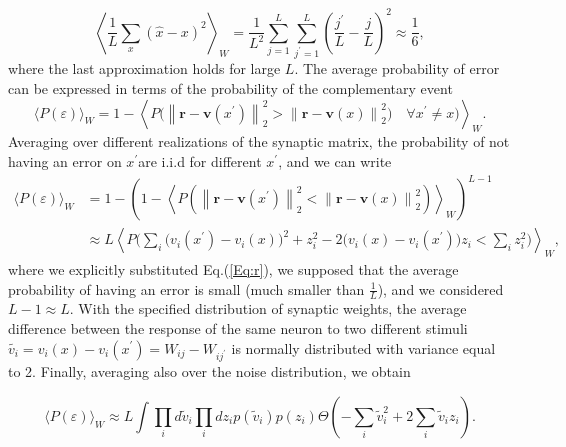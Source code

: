 \documentclass[a4paper]{article}%
\begin{document}
\begin{equation}
\left\langle \frac{1}{L}\sum_{x} (\hat{x}-x)^{2}\right\rangle _{W} =\frac
{1}{L^{2}}\sum_{j=1}^{L} \sum_{j^{\prime}=1}^{L} \left( \frac{j^{\prime}}%
{L}-\frac{j}{L}\right) ^{2} \approx\frac{1}{6},
\end{equation}
where the last approximation holds for large $L$. The average probability of
error can be expressed in terms of the probability of the complementary event
\begin{equation}
\langle P(\varepsilon)\rangle_{W} = 1 - \left\langle P\Big(\left\|
\mathbf{r}-\mathbf{v}(x^{\prime})\right\| _{2}^{2} >\left\|  \mathbf{r}%
-\mathbf{v}(x)\right\| _{2}^{2}) \quad\forall x^{\prime}\neq
x\Big) \right\rangle _{W}.
\end{equation}
Averaging over different realizations of the synaptic matrix, the probability
of not having an error on $x^{\prime}$are i.i.d for different $x^{\prime}$,
and we can write
\begin{equation}%
\begin{split}
\langle P(\varepsilon)\rangle_{W}  & = 1 - \left( 1 - \left\langle P\left(
\left\|  \mathbf{r}-\mathbf{v}(x^{\prime})\right\| _{2}^{2} < \left\|
\mathbf{r}-\mathbf{v}(x)\right\| _{2}^{2} \right) \right\rangle _{W}\right)
^{L-1}\\
&  \approx L \left\langle P\Big(\sum_{i} \big(v_{i}(x^{\prime}) -v_{i}%
(x)\big)^{2} + z_{i}^{2} - 2\big(v_{i}(x)-v_{i}(x^{\prime})\big)z_{i} <
\sum_{i} z_{i}^{2} \Big) \right\rangle _{W},
\end{split}
\end{equation}
where we explicitly substituted Eq.(\ref{Eq:r}), we supposed that the average
probability of having an error is small (much smaller than $\frac{1}{L}$), and
we considered $L-1 \approx L$. With the specified distribution of synaptic
weights, the average difference between the response of the same neuron to two
different stimuli $\tilde{v_{i}} = v_{i}(x)-v_{i}(x^{\prime}) = W_{ij}%
-W_{ij^{\prime}}$ is normally distributed with variance equal to 2. Finally,
averaging also over the noise distribution, we obtain%

\begin{equation}
\langle P(\varepsilon)\rangle_{W} \approx L \int\prod_{i} d \tilde{v}_{i}
\prod_{i} dz_{i} p(\tilde{v}_{i}) p(z_{i}) \Theta\left( -\sum_{i} \tilde
{v}^{2}_{i} +2\sum_{i} \tilde{v}_{i} z_{i}\right) .
\end{equation}
\end{document}
